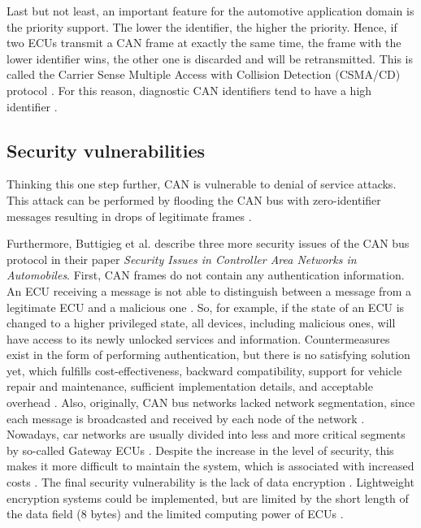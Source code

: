 Last but not least, an important feature for the automotive application domain is the priority support. The lower the identifier, the higher the priority. Hence, if two ECUs transmit a CAN frame at exactly the same time, the frame with the lower identifier wins, the other one is discarded and will be retransmitted. This is called the Carrier Sense Multiple Access with Collision Detection (CSMA/CD) protocol \cite{Sharma2016}. For this reason, diagnostic CAN identifiers tend to have a high identifier \cite{Herrewegen2018}.

\subsection{Security vulnerabilities}

Thinking this one step further, CAN is vulnerable to denial of service attacks. This attack can be performed by flooding the CAN bus with zero-identifier messages resulting in drops of legitimate frames \cite{Buttigieg2017}.

Furthermore, Buttigieg et al. \cite{Buttigieg2017} describe three more security issues of the CAN bus protocol in their paper \emph{Security Issues in Controller Area Networks in Automobiles}.
First, CAN frames do not contain any authentication information. An ECU receiving a message is not able to distinguish between a message from a legitimate ECU and a malicious one \cite{Buttigieg2017}. So, for example, if the state of an ECU is changed to a higher privileged state, all devices, including malicious ones, will have access to its newly unlocked services and information. Countermeasures exist in the form of performing authentication, but there is no satisfying solution yet, which fulfills cost-effectiveness, backward compatibility, support for vehicle repair and maintenance, sufficient implementation details, and acceptable overhead \cite{Bozdal2020}.
Also, originally, CAN bus networks lacked network segmentation, since each message is broadcasted and received by each node of the network \cite{Buttigieg2017}. Nowadays, car networks are usually divided into less and more critical segments by so-called Gateway ECUs \cite{Bozdal2020}. Despite the increase in the level of security, this makes it more difficult to maintain the system, which is associated with increased costs \cite{Bozdal2020}.
The final security vulnerability is the lack of data encryption \cite{Buttigieg2017}. Lightweight encryption systems could be implemented, but are limited by the short length of the data field (8 bytes) and the limited computing power of ECUs \cite{Bozdal2020}.

